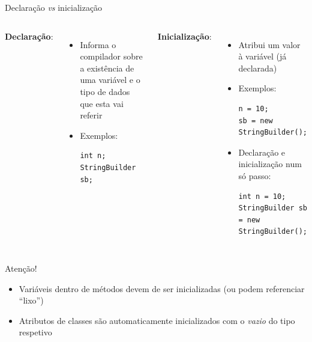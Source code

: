 \documentclass[portuguese, aspectratio=169, xcolor=table]{beamer}
\begin{document}
\begin{frame}[fragile]{Declaração \textit{vs} inicialização}
\begin{columns}
\textbf{Declaração}:
\begin{itemize}
    \item Informa o compilador sobre a existência de uma variável e o tipo de dados que esta vai referir
    \item Exemplos:
\begin{verbatim}
int n;
StringBuilder sb;
\end{verbatim}
\end{itemize}
\textbf{Inicialização}:
\begin{itemize}
    \item Atribui um valor à variável (já declarada)
    \item Exemplos:
\begin{verbatim}
n = 10;
sb = new StringBuilder();
\end{verbatim}
\item Declaração e inicialização num só passo:
\begin{verbatim}
int n = 10;
StringBuilder sb = new StringBuilder();
\end{verbatim}
\end{itemize}
\end{columns}
\begin{alertblock}{Atenção!}
 \begin{itemize}
     \item Variáveis dentro de métodos devem de ser inicializadas (ou podem referenciar ``lixo'')
     \item Atributos de classes são automaticamente inicializados com o \textit{vazio} do tipo respetivo
 \end{itemize}
\end{alertblock}
\end{frame}
\end{document}

